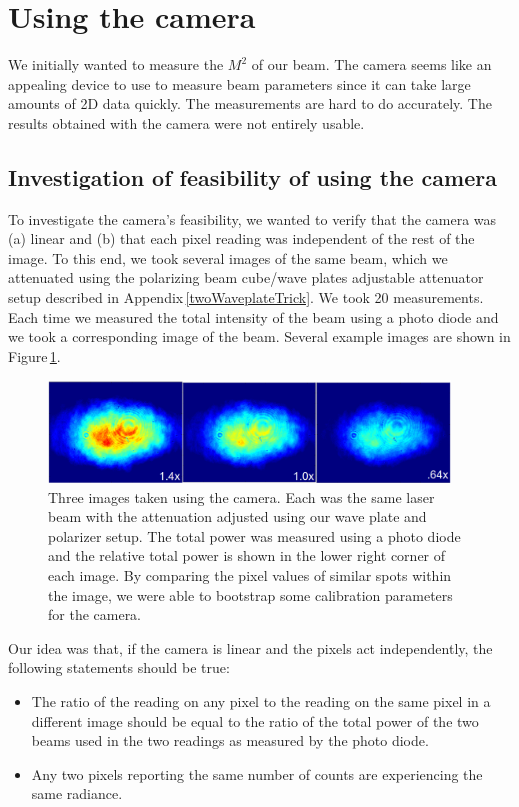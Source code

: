 \section{Using the camera}
We initially wanted to measure the $M^2$ of our beam. 
The camera seems like an appealing device to use to measure beam parameters since it can take large amounts of 2D data quickly.
The measurements are hard to do accurately. The results obtained with the camera were not entirely usable.

\subsection{Investigation of feasibility of using the camera}

To investigate the camera's feasibility, we wanted to verify that the camera was (a) linear and (b) that each pixel reading was independent of the rest of the image. To this end, we took several images of the same beam, which we attenuated using the polarizing beam cube/wave plates adjustable attenuator setup described in Appendix\,\ref{twoWaveplateTrick}. We took 20 measurements. Each time we measured the total intensity of the beam using a photo diode and we took a corresponding image of the beam. Several example images are shown in Figure\,\ref{cameraimageexample}.

\begin{figure}
\centerline{
\includegraphics[width=0.95\textwidth]{cameraimage}
}
\caption[Sample camera images]{Three images taken using the camera. Each was the same laser beam with the attenuation adjusted using our wave plate and polarizer setup. The total power was measured using a photo diode and the relative total power is shown in the lower right corner of each image. By comparing the pixel values of similar spots within the image, we were able to bootstrap some calibration parameters for the camera. \label{cameraimageexample}}
\end{figure}

Our idea was that, if the camera is linear and the pixels act independently, the following statements should be true: 
\begin{itemize}
\item The ratio of the reading on any pixel to the reading on the same pixel in a different image should be equal to the ratio of the total power of the two beams used in the two readings as measured by the photo diode. 
\item Any two pixels reporting the same number of counts are experiencing the same radiance.
\end{itemize}

